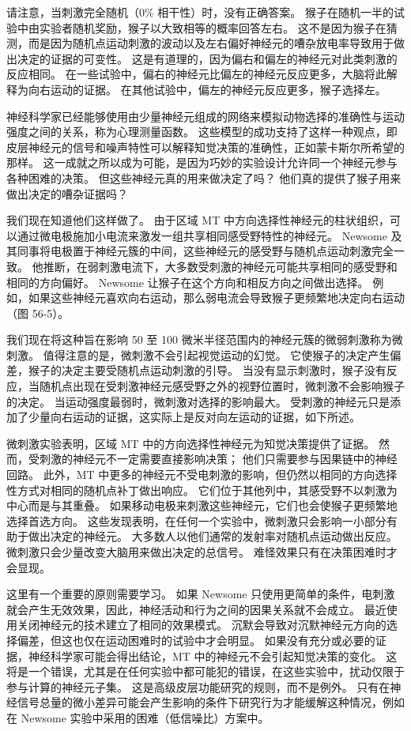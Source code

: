 请注意，当刺激完全随机（0\% 相干性）时，没有正确答案。 猴子在随机一半的试验中由实验者随机奖励，猴子以大致相等的概率回答左右。 这不是因为猴子在猜测，而是因为随机点运动刺激的波动以及左右偏好神经元的嘈杂放电率导致用于做出决定的证据的可变性。 这是有道理的，因为偏右和偏左的神经元对此类刺激的反应相同。 在一些试验中，偏右的神经元比偏左的神经元反应更多，大脑将此解释为向右运动的证据。 在其他试验中，偏左的神经元反应更多，猴子选择左。

神经科学家已经能够使用由少量神经元组成的网络来模拟动物选择的准确性与运动强度之间的关系，称为心理测量函数。 这些模型的成功支持了这样一种观点，即皮层神经元的信号和噪声特性可以解释知觉决策的准确性，正如蒙卡斯尔所希望的那样。 这一成就之所以成为可能，是因为巧妙的实验设计允许同一个神经元参与各种困难的决策。 但这些神经元真的用来做决定了吗？ 他们真的提供了猴子用来做出决定的嘈杂证据吗？

我们现在知道他们这样做了。 由于区域 MT 中方向选择性神经元的柱状组织，可以通过微电极施加小电流来激发一组共享相同感受野特性的神经元。 Newsome 及其同事将电极置于神经元簇的中间，这些神经元的感受野与随机点运动刺激完全一致。 他推断，在弱刺激电流下，大多数受刺激的神经元可能共享相同的感受野和相同的方向偏好。 Newsome 让猴子在这个方向和相反方向之间做出选择。 例如，如果这些神经元喜欢向右运动，那么弱电流会导致猴子更频繁地决定向右运动（图 56-5）。

我们现在将这种旨在影响 50 至 100 微米半径范围内的神经元簇的微弱刺激称为微刺激。 值得注意的是，微刺激不会引起视觉运动的幻觉。 它使猴子的决定产生偏差，猴子的决定主要受随机点运动刺激的引导。 当没有显示刺激时，猴子没有反应，当随机点出现在受刺激神经元感受野之外的视野位置时，微刺激不会影响猴子的决定。 当运动强度最弱时，微刺激对选择的影响最大。 受刺激的神经元只是添加了少量向右运动的证据，这实际上是反对向左运动的证据，如下所述。

微刺激实验表明，区域 MT 中的方向选择性神经元为知觉决策提供了证据。 然而，受刺激的神经元不一定需要直接影响决策； 他们只需要参与因果链中的神经回路。 此外，MT 中更多的神经元不受电刺激的影响，但仍然以相同的方向选择性方式对相同的随机点补丁做出响应。 它们位于其他列中，其感受野不以刺激为中心而是与其重叠。 如果移动电极来刺激这些神经元，它们也会使猴子更频繁地选择首选方向。 这些发现表明，在任何一个实验中，微刺激只会影响一小部分有助于做出决定的神经元。 大多数人以他们通常的发射率对随机点运动做出反应。 微刺激只会少量改变大脑用来做出决定的总信号。 难怪效果只有在决策困难时才会显现。

这里有一个重要的原则需要学习。 如果 Newsome 只使用更简单的条件，电刺激就会产生无效效果，因此，神经活动和行为之间的因果关系就不会成立。 最近使用关闭神经元的技术建立了相同的效果模式。 沉默会导致对沉默神经元方向的选择偏差，但这也仅在运动困难时的试验中才会明显。 如果没有充分或必要的证据，神经科学家可能会得出结论，MT 中的神经元不会引起知觉决策的变化。 这将是一个错误，尤其是在任何实验中都可能犯的错误，在这些实验中，扰动仅限于参与计算的神经元子集。 这是高级皮层功能研究的规则，而不是例外。 只有在神经信号总量的微小差异可能会产生影响的条件下研究行为才能缓解这种情况，例如在 Newsome 实验中采用的困难（低信噪比）方案中。

